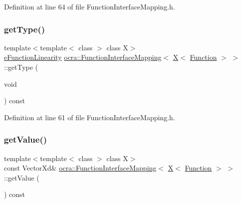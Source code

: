 Definition at line 64 of file Function\+Interface\+Mapping.\+h.

\hypertarget{structocra_1_1FunctionInterfaceMapping_3_01X_3_01Function_01_4_01_4_aa94a871947504091aa69bd1b704d5120}{}\label{structocra_1_1FunctionInterfaceMapping_3_01X_3_01Function_01_4_01_4_aa94a871947504091aa69bd1b704d5120} 
\subsubsection{\texorpdfstring{get\+Type()}{getType()}}
{\footnotesize\ttfamily template$<$template$<$ class $>$ class X$>$ \\
\hyperlink{namespaceocra_a87b525b5508b0f6e9d931f14c7c226ab}{e\+Function\+Linearity} \hyperlink{structocra_1_1FunctionInterfaceMapping}{ocra\+::\+Function\+Interface\+Mapping}$<$ \hyperlink{namespaceocra_a436781c7059a0f76027df1c652126260a53f3cfeeb322946db40cd86dfebfb237}{X}$<$ \hyperlink{classocra_1_1Function}{Function} $>$ $>$\+::get\+Type (\begin{DoxyParamCaption}\item[{void}]{ }\end{DoxyParamCaption}) const\hspace{0.3cm}{\ttfamily [inline]}}



Definition at line 61 of file Function\+Interface\+Mapping.\+h.

\hypertarget{structocra_1_1FunctionInterfaceMapping_3_01X_3_01Function_01_4_01_4_a80402679b788ec002d7fa16a2c36838f}{}\label{structocra_1_1FunctionInterfaceMapping_3_01X_3_01Function_01_4_01_4_a80402679b788ec002d7fa16a2c36838f} 
\subsubsection{\texorpdfstring{get\+Value()}{getValue()}\hspace{0.1cm}{\footnotesize\ttfamily [1/2]}}
{\footnotesize\ttfamily template$<$template$<$ class $>$ class X$>$ \\
const Vector\+Xd\& \hyperlink{structocra_1_1FunctionInterfaceMapping}{ocra\+::\+Function\+Interface\+Mapping}$<$ \hyperlink{namespaceocra_a436781c7059a0f76027df1c652126260a53f3cfeeb322946db40cd86dfebfb237}{X}$<$ \hyperlink{classocra_1_1Function}{Function} $>$ $>$\+::get\+Value (\begin{DoxyParamCaption}{ }\end{DoxyParamCaption}) const\hspace{0.3cm}{\ttfamily [inline]}}



